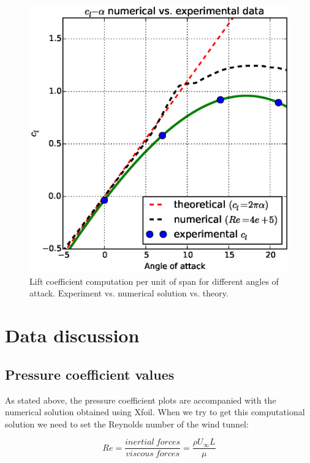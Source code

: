 \documentclass[10pt]{SelfArx} %
\begin{document}
\begin{figure}[ht!]
\centering
\includegraphics[scale=0.55]{plots/cl-alpha.eps}
\caption{Lift coefficient computation per unit of span for different angles of attack. Experiment vs. numerical solution vs. theory.}
\end{figure}

\newpage


\section{Data discussion}
\subsection{Pressure coefficient values}

As stated above, the pressure coefficient plots are accompanied with the numerical solution obtained using Xfoil. When we try to get this computational solution we need to set the Reynolds number of the wind tunnel:

\begin{equation} Re = \frac{inertial \ forces}{viscous \ forces}  = \frac{\rho U_{\infty} L}{\mu} \end{equation}
\end{document}
